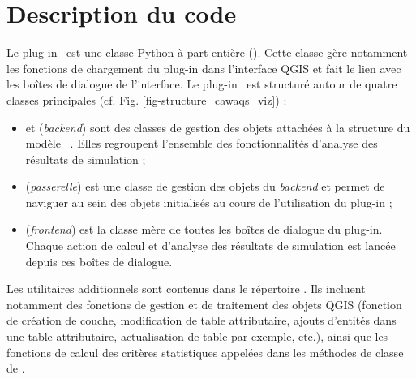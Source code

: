 \chapter{Description du code}
\label{chap-description-src}

\renewcommand{\headrulewidth}{0.3pt}
\fancyhead[LE]{\thepage} \fancyhead[RE]{\nouppercase{\textbf{\leftmark}}}
\fancyhead[RO]{\thepage} \fancyhead[LO]{\nouppercase{\textbf{\rightmark}}}
\fancyfoot[L,C,R]{}

\setlength{\parindent}{0.35cm}

\minitoc


Le plug-in \cwv~est une classe Python à part entière ().
Cette classe gère notamment les fonctions de chargement du plug-in dans l'interface
QGIS et fait le lien avec les boîtes de dialogue de l'interface. Le plug-in \cwv~est
structuré autour de quatre classes principales (cf. Fig.
\ref{fig-structure_cawaqs_viz}) :
\begin{itemize}
    \item {} et  (\textit{backend}) sont des classes
        de gestion des objets attachées à la structure du modèle \cawaqs~. Elles
        regroupent l'ensemble des fonctionnalités d'analyse des résultats de
        simulation ;

    \item {} (\textit{passerelle}) est une classe de gestion des objets
        du \textit{backend} et permet de naviguer au sein des objets initialisés
        au cours de l'utilisation du plug-in ;

    \item {} (\textit{frontend}) est la classe mère de toutes les boîtes
        de dialogue du plug-in. Chaque action de calcul et d'analyse des
        résultats de simulation est lancée depuis ces boîtes de dialogue.
\end{itemize}

Les utilitaires additionnels sont contenus dans le répertoire . Ils
incluent notamment des fonctions de gestion et de traitement des objets QGIS (fonction
de création de couche, modification de table attributaire, ajouts d'entités dans
une table attributaire, actualisation de table par exemple, etc.), ainsi que les
fonctions de calcul des critères statistiques appelées dans les méthodes de
classe de .\\

